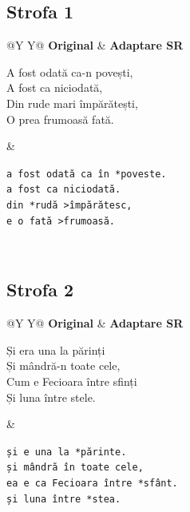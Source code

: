 \documentclass[12pt,onecolumn,letterpaper]{article}
\newcommand{\rs}[1]{\texttt{#1}}
\begin{document}
\subsection*{Strofa 1}
\noindent
\begin{tabularx}{\linewidth}{@{}Y Y@{}}
\textbf{Original} & \textbf{Adaptare SR} \\
\begin{minipage}[t]{\linewidth}\vspace{0pt}
A fost odată ca-n povești,\\
A fost ca niciodată,\\
Din rude mari împărătești,\\
O prea frumoasă fată.
\end{minipage}
&
\begin{minipage}[t]{\linewidth}\vspace{0pt}
\rs{a fost odată ca în *poveste.}\\
\rs{a fost ca niciodată.}\\
\rs{din *rudă >împărătesc,}\\
\rs{e o fată >frumoasă.}
\end{minipage}
\\
\end{tabularx}

\subsection*{Strofa 2}
\noindent
\begin{tabularx}{\linewidth}{@{}Y Y@{}}
\textbf{Original} & \textbf{Adaptare SR} \\
\begin{minipage}[t]{\linewidth}\vspace{0pt}
Și era una la părinți\\
Și mândră-n toate cele,\\
Cum e Fecioara între sfinți\\
Și luna între stele.
\end{minipage}
&
\begin{minipage}[t]{\linewidth}\vspace{0pt}
\rs{și e una la *părinte.}\\
\rs{și mândră în toate cele,}\\
\rs{ea e ca Fecioara între *sfânt.}\\
\rs{și luna între *stea.}
\end{minipage}
\\
\end{tabularx}
\end{document}
